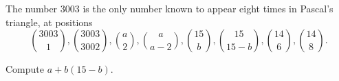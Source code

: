 The number $3003$ is the only number known to appear eight times in Pascal's triangle, at positions
\[ \binom{3003}{1}, \binom{3003}{3002}, \binom{a}{2}, \binom{a}{a-2}, \binom{15}{b}, \binom{15}{15 - b}, \binom{14}{6}, \binom{14}{8}.\]

Compute $a + b(15 - b)$.
